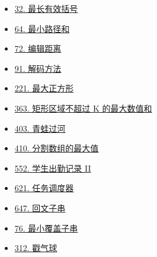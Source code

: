 \begin{itemize}
  \item \hyperref[leetcode:32]{32. 最长有效括号}
  \item \hyperref[leetcode:64]{64. 最小路径和}
  \item \hyperref[leetcode:72]{72. 编辑距离}
  \item \hyperref[leetcode:91]{91. 解码方法}
  \item \hyperref[leetcode:221]{221. 最大正方形}
  \item \hyperref[leetcode:363]{363. 矩形区域不超过 K 的最大数值和}
  \item \hyperref[leetcode:403]{403. 青蛙过河}
  \item \hyperref[leetcode:410]{410. 分割数组的最大值}
  \item \hyperref[leetcode:552]{552. 学生出勤记录 II}
  \item \hyperref[leetcode:621]{621. 任务调度器}
  \item \hyperref[leetcode:647]{647. 回文子串}
  \item \hyperref[leetcode:76]{76. 最小覆盖子串}
  \item \hyperref[leetcode:312]{312. 戳气球}
\end{itemize}
